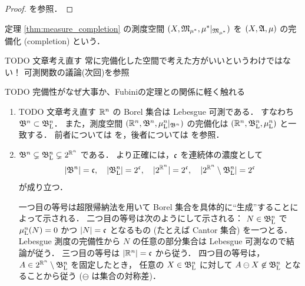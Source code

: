 \begin{proof}
    \cite[定理 8.4]{It63} を参照．
\end{proof}

\begin{definition}
    定理 \ref{thm:measure_completion} の測度空間 $(X,\mathfrak{M}_{\mu^*},\mu^\ast\vert_{\mathfrak{M}_{\mu^\ast}})$ を
    $(X,\mathfrak{A},\mu)$ の完備化 (completion) という．
\end{definition}

{\color{red} TODO 文章考え直す}
常に完備化した空間で考えた方がいいというわけではない！ 
可測関数の議論(次回)を参照

{\color{red} TODO 完備性がなぜ大事か、Fubiniの定理との関係に軽く触れる}

\begin{remark}\label{rem:Borel_Lebesgue}
    \leavevmode
    \begin{enumerate}
        \item
            {\color{red} TODO 文章考え直す}
            $\mathbb{R}^n$ の Borel 集合は Lebesgue 可測である．
            すなわち $\mathfrak{B}^n\subset\mathfrak{B}_{\mathrm{L}}^n$．
            また，測度空間 $(\mathbb{R}^n,\mathfrak{B}^n,\mu_{\mathrm{L}}^n\vert_{\mathfrak{B}^n})$ の完備化は
            $(\mathbb{R}^n,\mathfrak{B}_{\mathrm{L}}^n,\mu_{\mathrm{L}}^n)$ と一致する．
            前者については \cite[定理 7.2]{It63} を，後者については \cite[p.49]{It63} を参照．

        \item
            $\mathfrak{B}^n\subsetneq\mathfrak{B}_{\mathrm{L}}^n\subsetneq2^{\mathbb{R}^n}$ である．
            より正確には，$\mathfrak{c}$ を連続体の濃度として
            \begin{align}
                |\mathfrak{B}^n|=\mathfrak{c},\quad
                |\mathfrak{B}_{\mathrm{L}}^n|=2^{\mathfrak{c}},\quad
                |2^{\mathbb{R}^n}|=2^{\mathfrak{c}},\quad
                |2^{\mathbb{R}^n}\setminus\mathfrak{B}_{\mathrm{L}}^n|=2^{\mathfrak{c}}
            \end{align}
            が成り立つ．

            一つ目の等号は超限帰納法を用いて Borel 集合を具体的に``生成''することによって示される\cite{ms70880}．
            二つ目の等号は次のようにして示される：
            $N\in\mathfrak{B}_{\mathrm{L}}^n$ で $\mu_{\mathrm{L}}^n(N)=0$ かつ $|N|=\mathfrak{c}$ となるもの (たとえば Cantor 集合) を一つとる．
            Lebesgue 測度の完備性から $N$ の任意の部分集合は Lebesgue 可測なので結論が従う．
            三つ目の等号は $|\mathbb{R}^n|=\mathfrak{c}$ から従う．
            四つ目の等号は，$A\in2^{\mathbb{R}^n}\setminus\mathfrak{B}_{\mathrm{L}}^n$ を固定したとき，
            任意の $X\in\mathfrak{B}_{\mathrm{L}}^n$ に対して $A\ominus X\not\in\mathfrak{B}_{\mathrm{L}}^n$ となることから従う ($\ominus$ は集合の対称差)．


\end{enumerate}
\end{remark}
